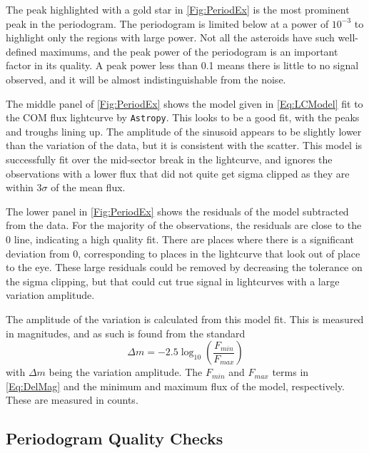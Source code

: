 \documentclass{UCreport}
\begin{document}
The peak highlighted with a gold star in \autoref{Fig:PeriodEx} is the most prominent peak in the periodogram.
The periodogram is limited below at a power of $10^{-3}$ to highlight only the regions with large power.
Not all the asteroids have such well-defined maximums, and the peak power of the periodogram is an important factor in its quality.
A peak power less than 0.1 means there is little to no signal observed, and it will be almost indistinguishable from the noise.

The middle panel of \autoref{Fig:PeriodEx} shows the model given in \autoref{Eq:LCModel} fit to the COM flux lightcurve by \texttt{Astropy}.
This looks to be a good fit, with the peaks and troughs lining up.
The amplitude of the sinusoid appears to be slightly lower than the variation of the data, but it is consistent with the scatter.
This model is successfully fit over the mid-sector break in the lightcurve, and ignores the observations with a lower flux that did not quite get sigma clipped as they are within $3\sigma$ of the mean flux.

The lower panel in \autoref{Fig:PeriodEx} shows the residuals of the model subtracted from the data.
For the majority of the observations, the residuals are close to the 0 line, indicating a high quality fit.
There are places where there is a significant deviation from 0, corresponding to places in the lightcurve that look out of place to the eye.
These large residuals could be removed by decreasing the tolerance on the sigma clipping, but that could cut true signal in lightcurves with a large variation amplitude.

The amplitude of the variation is calculated from this model fit.
This is measured in magnitudes, and as such is found from the standard
\begin{equation} \label{Eq:DelMag}
  \Delta m = -2.5 \log_{10}(\frac{F_{min}}{F_{max}})
\end{equation}
with $\Delta m$ being the variation amplitude.
The $F_{min}$ and $F_{max}$ terms in \autoref{Eq:DelMag} and the minimum and maximum flux of the model, respectively.
These are measured in counts.




\subsection{Periodogram Quality Checks}\label{SubSec:QualCheck}
\end{document}
